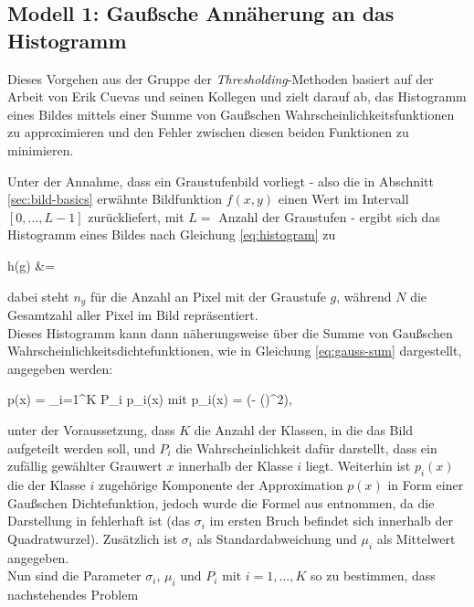 		\subsection{Modell 1: Gaußsche Annäherung an das Histogramm}
		\label{sub:meth1}
			
			Dieses Vorgehen aus der Gruppe der \textit{Thresholding}-Methoden basiert auf der Arbeit von Erik Cuevas und seinen Kollegen \cite{cuevas-meth1} und zielt darauf ab, das Histogramm eines Bildes mittels einer Summe von Gaußschen Wahrscheinlichkeitsfunktionen zu approximieren und den Fehler zwischen diesen beiden Funktionen zu minimieren.
			
			Unter der Annahme, dass ein Graustufenbild vorliegt - also die in Abschnitt \ref{sec:bild-basics} erwähnte Bildfunktion $f(x,y)$ einen Wert im Intervall $[0, ..., L-1]$ zurückliefert, mit $L = $ Anzahl der Graustufen - ergibt sich das Histogramm eines Bildes nach Gleichung \ref{eq:histogram} zu
			\begin{flalign}
				\centering
				h(g) &=  \label{eq:histogram}
			\end{flalign}
			dabei steht $n_{g}$ für die Anzahl an Pixel mit der Graustufe $g$, während $N$ die Gesamtzahl aller Pixel im Bild repräsentiert.\\
			Dieses Histogramm kann dann näherungsweise über die Summe von Gaußschen Wahrscheinlichkeitsdichtefunktionen, wie in Gleichung \ref{eq:gauss-sum} dargestellt, angegeben werden:
			\begin{flalign}
				\centering
				p(x) = \sum_{i=1}^{K} P_{i} \cdot p_{i}(x) \quad \textrm{mit} \quad p_{i}(x) =  \exp\left(- \cdot \left(\right)^{2}\right), \label{eq:gauss-sum}
			\end{flalign}
			unter der Voraussetzung, dass $K$ die Anzahl der Klassen, in die das Bild aufgeteilt werden soll, und $P_{i}$ die Wahrscheinlichkeit dafür darstellt, dass ein zufällig gewählter Grauwert $x$ innerhalb der Klasse $i$ liegt. Weiterhin ist $p_{i}(x)$ die der Klasse $i$ zugehörige Komponente der Approximation $p(x)$ in Form einer Gaußschen Dichtefunktion, jedoch wurde die Formel aus \cite{papula-gauss} entnommen, da die Darstellung in \cite{cuevas-meth1} fehlerhaft ist (das $\sigma_{i}$ im ersten Bruch befindet sich innerhalb der Quadratwurzel). Zusätzlich ist $\sigma_{i}$ als Standardabweichung und $\mu_{i}$ als Mittelwert angegeben.\\
			Nun sind die Parameter $\sigma_{i}$, $\mu_{i}$ und $P_{i}$ mit $i = 1, ..., K$ so zu bestimmen, dass nachstehendes Problem
